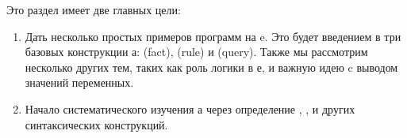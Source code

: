 \label{lpn1}\secdown

Это раздел имеет две главных цели:
\begin{enumerate}
  \item 
Дать несколько простых примеров программ на \prolog e. Это будет введением в три
базовых конструкции \prolog а:  (fact),  (rule) и
 (query). Также мы рассмотрим несколько других тем, таких как роль
логики в \prolog е, и важную идею  c выводом значений
переменных.
  \item 
Начало систематического изучения \prolog а через определение ,
,  и других синтаксических конструкций.
\end{enumerate}





 
\secup
